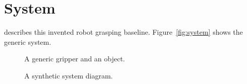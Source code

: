 \section{System}
\label{sec:system}
\citeauthor{simple_grasp} describes this invented robot grasping baseline.
Figure~\autoref{fig:system} shows the generic system.
\begin{figure}
\centering A generic gripper and an object.
\caption{A synthetic system diagram.}
\label{fig:system}
\end{figure}
